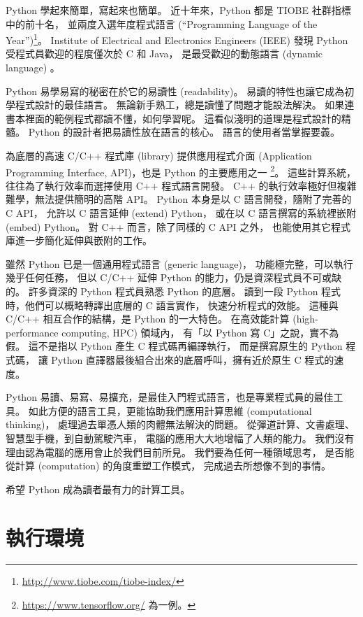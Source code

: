 \documentclass[a4paper,12pt]{book}
\theoremstyle{definition}
\begin{document}
Python 學起來簡單，寫起來也簡單。
近十年來，Python 都是 TIOBE 社群指標中的前十名，
並兩度入選年度程式語言
(``Programming Language of the Year'')\footnote{\url{http://www.tiobe.com/tiobe-index/}}。
Institute of Electrical and Electronics Engineers (IEEE) 發現
Python 受程式員歡迎的程度僅次於 C 和 Java，
是最受歡迎的動態語言 (dynamic language) \cite{cass_interactive:_2016}。

Python 易學易寫的秘密在於它的易讀性 (readability)。
易讀的特性也讓它成為初學程式設計的最佳語言。
無論新手熟工，總是讀懂了問題才能設法解決。
如果連書本裡面的範例程式都讀不懂，如何學習呢。
這看似淺明的道理是程式設計的精髓。
Python 的設計者把易讀性放在語言的核心。
語言的使用者當掌握要義。

為底層的高速 C/C++ 程式庫 (library) 提供應用程式介面 
(Application Programming Interface, API)，也是 Python 的主要應用之一%
\footnote{\url{https://www.tensorflow.org/} 為一例。}。
這些計算系統，往往為了執行效率而選擇使用 C++ 程式語言開發。
C++ 的執行效率極好但複雜難學，無法提供簡明的高階 API。
Python 本身是以 C 語言開發，隨附了完善的 C API，
允許以 C 語言延伸 (extend) Python，
或在以 C 語言撰寫的系統裡嵌附 (embed) Python。
對 C++ 而言，除了同樣的 C API 之外，
也能使用其它程式庫進一步簡化延伸與嵌附的工作。

雖然 Python 已是一個通用程式語言 (generic language)，
功能極完整，可以執行幾乎任何任務，
但以 C/C++ 延伸 Python 的能力，仍是資深程式員不可或缺的。
許多資深的 Python 程式員熟悉 Python 的底層。
讀到一段 Python 程式時，他們可以概略轉譯出底層的 C 語言實作，
快速分析程式的效能。
這種與 C/C++ 相互合作的結構，是 Python 的一大特色。
在高效能計算 (high-performance computing, HPC) 領域內，
有「以 Python 寫 C」之說，實不為假。
這不是指以 Python 產生 C 程式碼再編譯執行，
而是撰寫原生的 Python 程式碼，
讓 Python 直譯器最後組合出來的底層呼叫，擁有近於原生 C 程式的速度。

Python 易讀、易寫、易擴充，是最佳入門程式語言，也是專業程式員的最佳工具。
如此方便的語言工具，更能協助我們應用計算思維 (computational thinking)，
處理過去單憑人類的肉體無法解決的問題。
從彈道計算、文書處理、智慧型手機，到自動駕駛汽車，
電腦的應用大大地增幅了人類的能力。
我們沒有理由認為電腦的應用會止於我們目前所見。
我們要為任何一種領域思考，
是否能從計算 (computation) 的角度重塑工作模式，
完成過去所想像不到的事情。

希望 Python 成為讀者最有力的計算工具。

\mainmatter

\chapter{執行環境}
%
\label{c:runtime}
\end{document}
